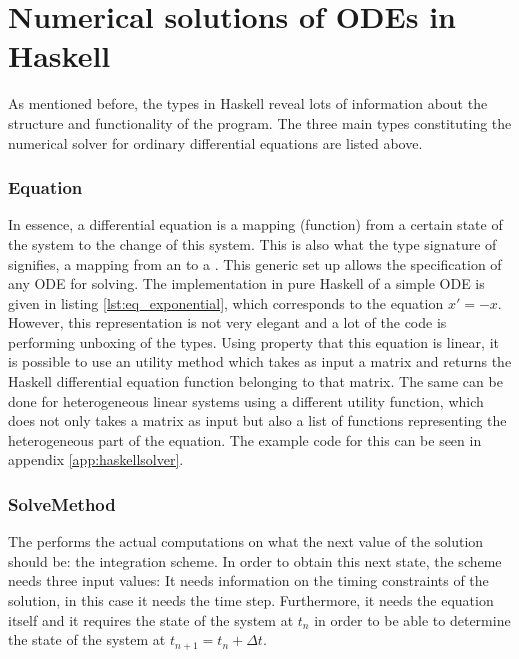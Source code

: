 \section{Numerical solutions of ODEs in Haskell}
\lstset{style=haskellStyle}

As mentioned before, the types in Haskell reveal lots of information about the structure and functionality of the program. The three main types constituting the numerical solver for ordinary differential equations are listed above.



\subsubsection{Equation}
In essence, a differential equation is a mapping (function) from a certain state of the system to the change of this system. This is also what the type signature of  signifies, a mapping from an  to a . This generic set up allows the specification of any ODE for solving. The implementation in pure Haskell of a simple ODE is given in listing \ref{lst:eq_exponential}, which corresponds to the equation $x' = -x$. However, this representation is not very elegant and a lot of the code is performing unboxing of the types. Using property that this equation is linear, it is possible to use an utility method which takes as input a matrix and returns the Haskell differential equation function belonging to that matrix. The same can be done for heterogeneous linear systems using a different utility function, which does not only takes a matrix as input but also a list of functions representing the heterogeneous part of the equation. The example code for this can be seen in appendix \ref{app:haskellsolver}.



\subsubsection{SolveMethod}
The  performs the actual computations on what the next value of the solution should be: the integration scheme. In order to obtain this next state, the scheme needs three input values: It needs information on the timing constraints of the solution, in this case it needs the time step. Furthermore, it needs the equation itself and it requires the state of the system at $t_{n}$ in order to be able to determine the state of the system at $t_{n+1} = t_{n} + \Delta t$.

